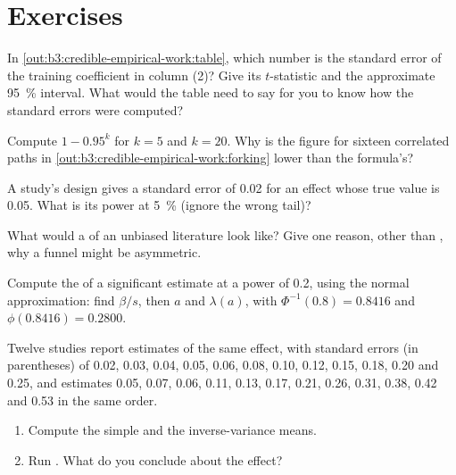 \section{Exercises}\label{sec:b3:credible-empirical-work:exercises}

\begin{exercise}[$\star$]\label{exo:b3:credible-empirical-work:1}
In \cref{out:b3:credible-empirical-work:table}, which number is the standard
error of the training coefficient in column (2)? Give its $t$-statistic and the
approximate 95~\% interval. What would the table need to say for you to know
how the standard errors were computed?
\end{exercise}

\begin{exercise}[$\star$]\label{exo:b3:credible-empirical-work:2}
Compute $1 - 0.95^k$ for $k = 5$ and $k = 20$. Why is the figure for sixteen
correlated paths in \cref{out:b3:credible-empirical-work:forking} lower than the
formula's?
\end{exercise}

\begin{exercise}[$\star$]\label{exo:b3:credible-empirical-work:3}
A study's design gives a standard error of 0.02 for an effect whose true value
is 0.05. What is its power at 5~\% (ignore the wrong tail)?
\end{exercise}

\begin{exercise}[$\star$]\label{exo:b3:credible-empirical-work:4}
What would a  of an unbiased literature look like? Give one reason,
other than , why a funnel might be asymmetric.
\end{exercise}

\begin{exercise}[$\star\star$]\label{exo:b3:credible-empirical-work:5}
Compute the  of a significant estimate at a power of 0.2,
using the normal approximation: find $\beta/s$, then $a$ and $\lambda(a)$, with
$\Phi^{-1}(0.8) = 0.8416$ and $\phi(0.8416) = 0.2800$.
\end{exercise}

\begin{exercise}[$\star\star$]\label{exo:b3:credible-empirical-work:6}
Twelve studies report estimates of the same effect, with standard errors (in
parentheses) of 0.02, 0.03, 0.04, 0.05, 0.06, 0.08, 0.10, 0.12, 0.15, 0.18, 0.20 and
0.25, and estimates 0.05, 0.07, 0.06, 0.11, 0.13, 0.17, 0.21, 0.26, 0.31, 0.38, 0.42 and
0.53 in the same order.
\begin{enumerate}
\item Compute the simple and the inverse-variance means.
\item Run . What do you conclude about the effect?
\end{enumerate}
\end{exercise}

